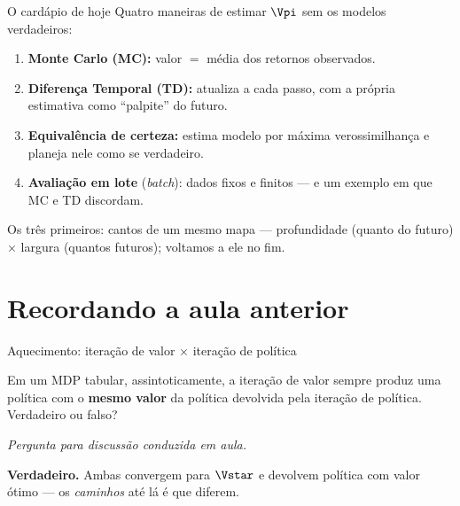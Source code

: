 \documentclass[aspectratio=169, 11pt]{beamer}
\newcommand{\paradiscussao}{\vspace{-0.2em}
  {\footnotesize\color{rlCinza}\itshape Pergunta para discussão conduzida em aula.}}
\begin{document}
\begin{frame}{O cardápio de hoje}
  Quatro maneiras de estimar $\Vpi$ sem os modelos verdadeiros:
  \begin{enumerate}
    \item \textbf{Monte Carlo (MC):} valor $=$ média dos retornos observados.
    \item \textbf{Diferença Temporal (TD):} atualiza a cada passo,
      com a própria estimativa como ``palpite'' do futuro.
    \item \textbf{Equivalência de certeza:} estima modelo por máxima
      verossimilhança e planeja nele como se verdadeiro.
    \item \textbf{Avaliação em lote} (\emph{batch}): dados fixos e finitos —
      e um exemplo em que MC e TD discordam.
  \end{enumerate}

  \begin{ideiabox}
    Os três primeiros: cantos de um mesmo mapa — profundidade (quanto do
    futuro) $\times$ largura (quantos futuros); voltamos a ele no fim.
  \end{ideiabox}
\end{frame}

\section{Recordando a aula anterior}

\begin{frame}{Aquecimento: iteração de valor $\times$ iteração de política}
  \begin{quizbox}{}
    Em um MDP tabular, assintoticamente, a iteração de valor sempre produz
    uma política com o \textbf{mesmo valor} da política devolvida pela
    iteração de política. Verdadeiro ou falso?
  \end{quizbox}
  \paradiscussao

  \pause
  \begin{respbox}
    \textbf{Verdadeiro.} Ambas convergem para $\Vstar$ e devolvem política
    com valor ótimo — os \emph{caminhos} até lá é que diferem.
  \end{respbox}
\end{frame}
\end{document}
